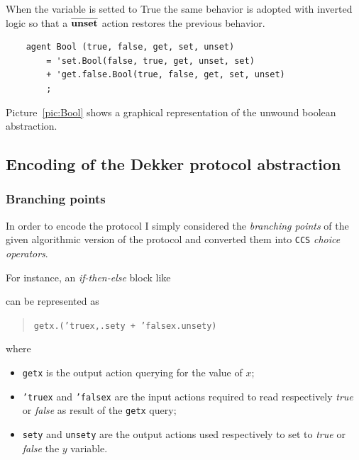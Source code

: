 \documentclass[10pt,a4paper]{article}
\newcommand{\CCS}{{\tt CCS}}
\newcommand{\CCSCode}[1]{{\tt #1}}
\newcommand{\Action}[1]{{\tt \bf {#1}}}
\newcommand{\CoAction}[1]{$\overline{\mbox{\Action{#1}}}$}
\begin{document}
        When the variable is setted to True the same behavior is adopted
        with inverted logic so that a \CoAction{unset} action restores the
        previous behavior.

        \begin{verbatim}
    agent Bool (true, false, get, set, unset)
        = 'set.Bool(false, true, get, unset, set)
        + 'get.false.Bool(true, false, get, set, unset)
        ;
        \end{verbatim}

        Picture~\ref{pic:Bool} shows a graphical representation of the
        unwound boolean abstraction.

    \subsection{Encoding of the Dekker protocol abstraction}

        \subsubsection{Branching points}
        \label{subsub:BranchingPoints}

            In order to encode the protocol I simply considered the
            \emph{branching points} of the given algorithmic version of
            the protocol and converted them into \CCS{} \emph{choice
            operators}.

            \noindent For instance, an \emph{if-then-else} block like
            \begin{quote}
                \begin{algorithm}[H]
                \end{algorithm}
            \end{quote}
            can be represented as
            \begin{quote}
            \CCSCode{getx.('truex,.sety + 'falsex.unsety)}
            \end{quote}
            where
            \begin{itemize}

            \item   \CCSCode{getx} is the output action querying for the
                    value of $x$;

            \item   \CCSCode{'truex} and \CCSCode{'falsex} are the input
                    actions required to read respectively \emph{true} or
                    \emph{false} as result of the \CCSCode{getx} query;

            \item   \CCSCode{sety} and \CCSCode{unsety} are the output
                    actions used respectively to set to \emph{true} or
                    \emph{false} the $y$ variable.

            \end{itemize}
\end{document}
